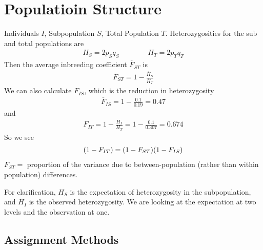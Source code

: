 \documentclass{article}
\begin{document}
        \section{Populatioin Structure}
            Individuals $I$, Subpopulation $S$, Total Population $T$.  Heterozygosities for the sub and total populations are
            \begin{align}
                H_S = 2p_Sq_S \qquad \qquad H_T = 2p_Tq_T
            \end{align}
            Then the average inbreeding coefficient $\overline{F}_{ST}$ is
            \begin{align}
                \overline{F}_{ST} = 1 - \frac{\overline{H}_S}{\overline{H}_T}
            \end{align}
            We can also calculate $F_{IS}$, which is the reduction in heterozygosity
            \begin{align}
                \overline{F}_{IS} = 1 - \frac{0.1}{0.19} = 0.47
            \end{align}
            and
            \begin{align}
                F_{IT} = 1 - \frac{H_I}{H_T} = 1 - \frac{0.1}{0.307} = 0.674
            \end{align}
            So we see
            \begin{align}
                \qty(1 - F_{IT}) = \qty(1 - F_{ST})\qty(1 - F_{IS})
            \end{align}
            $F_{ST} = $ proportion of the variance due to between-population (rather than within population) differences.

            For clarification, $H_S$ is the expectation of heterozygosity in the subpopulation, and $H_I$ is the observed heterozygosity.  We are looking at the expectation at two levels and the observation at one.

        \subsection{Assignment Methods}
            
\end{document}
